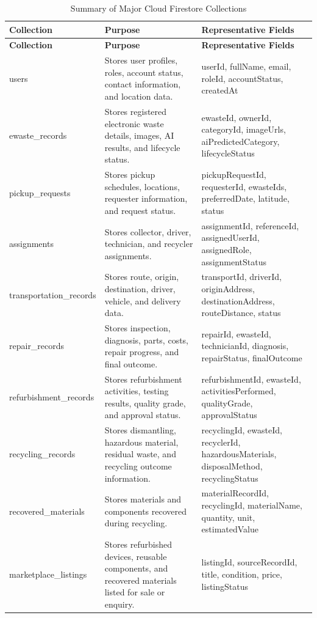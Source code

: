 \begin{longtable}{@{}p{3.2cm}p{4.6cm}p{5.4cm}@{}}
\caption{Summary of Major Cloud Firestore Collections} \label{tab:collections-summary} \\
\toprule \textbf{Collection} & \textbf{Purpose} & \textbf{Representative Fields} \\ \midrule
\endfirsthead
\toprule \textbf{Collection} & \textbf{Purpose} & \textbf{Representative Fields} \\ \midrule
\endhead
users & Stores user profiles, roles, account status, contact information, and location data. & userId, fullName, email, roleId, accountStatus, createdAt \\
ewaste\_records & Stores registered electronic waste details, images, AI results, and lifecycle status. & ewasteId, ownerId, categoryId, imageUrls, aiPredictedCategory, lifecycleStatus \\
pickup\_requests & Stores pickup schedules, locations, requester information, and request status. & pickupRequestId, requesterId, ewasteIds, preferredDate, latitude, status \\
assignments & Stores collector, driver, technician, and recycler assignments. & assignmentId, referenceId, assignedUserId, assignedRole, assignmentStatus \\
transportation\_records & Stores route, origin, destination, driver, vehicle, and delivery data. & transportId, driverId, originAddress, destinationAddress, routeDistance, status \\
repair\_records & Stores inspection, diagnosis, parts, costs, repair progress, and final outcome. & repairId, ewasteId, technicianId, diagnosis, repairStatus, finalOutcome \\
refurbishment\_records & Stores refurbishment activities, testing results, quality grade, and approval status. & refurbishmentId, ewasteId, activitiesPerformed, qualityGrade, approvalStatus \\
recycling\_records & Stores dismantling, hazardous material, residual waste, and recycling outcome information. & recyclingId, ewasteId, recyclerId, hazardousMaterials, disposalMethod, recyclingStatus \\
recovered\_materials & Stores materials and components recovered during recycling. & materialRecordId, recyclingId, materialName, quantity, unit, estimatedValue \\
marketplace\_listings & Stores refurbished devices, reusable components, and recovered materials listed for sale or enquiry. & listingId, sourceRecordId, title, condition, price, listingStatus \\

\end{longtable}
